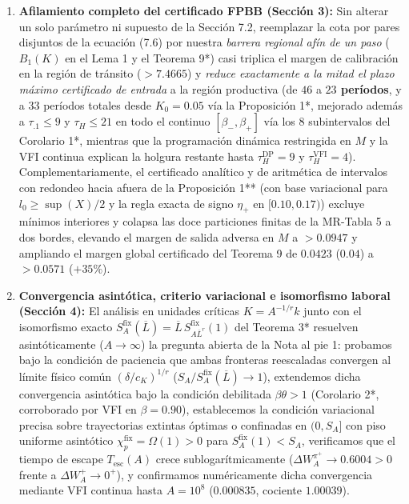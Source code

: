 \documentclass[11pt,letterpaper]{article}
\theoremstyle{plain}
\begin{document}
\begin{enumerate}
\item \textbf{Afilamiento completo del certificado FPBB (Sección 3):} Sin alterar un solo parámetro ni supuesto de la Sección 7.2, reemplazar la cota por pares disjuntos de la ecuación (7.6) por nuestra \emph{barrera regional afín de un paso} ($B_1(K)$ en el Lema 1 y el Teorema 9*) casi triplica el margen de calibración en la región de tránsito ($>7.4665$) y \emph{reduce exactamente a la mitad el plazo máximo certificado de entrada} a la región productiva (de $46$ a \textbf{$23$ períodos}, y a $33$ períodos totales desde $K_0=0.05$ vía la Proposición 1*, mejorado además a $\tau_{.1}\le 9$ y $\tau_H\le 21$ en todo el continuo $[\beta_-,\beta_+]$ vía los $8$ subintervalos del Corolario 1*, mientras que la programación dinámica restringida en $M$ y la VFI continua explican la holgura restante hasta $\tau_H^{\mathrm{DP}}=9$ y $\tau_H^{\mathrm{VFI}}=4$). Complementariamente, el certificado analítico y de aritmética de intervalos con redondeo hacia afuera de la Proposición 1** (con base variacional para $l_0\ge\sup(X)/2$ y la regla exacta de signo $\eta_+$ en $[0.10,0.17)$) excluye mínimos interiores y colapsa las doce particiones finitas de la MR-Tabla 5 a dos bordes, elevando el margen de salida adversa en $M$ a $>0.0947$ y ampliando el margen global certificado del Teorema 9 de $0.0423$ ($0.04$) a \textbf{$>0.0571$} ($+35\%$).

\item \textbf{Convergencia asintótica, criterio variacional e isomorfismo laboral (Sección 4):} El análisis en unidades críticas $K=A^{-1/r}k$ junto con el isomorfismo exacto $S_A^{\mathrm{fix}}(\overline{L})=\overline{L}\,S_{A\overline{L}^r}^{\mathrm{fix}}(1)$ del Teorema 3* resuelven asintóticamente ($A\to\infty$) la pregunta abierta de la Nota al pie 1: probamos bajo la condición de paciencia que ambas fronteras reescaladas convergen al límite físico común $(\delta/c_K)^{1/r}$ ($S_A/S_A^{\mathrm{fix}}(\overline{L})\to 1$), extendemos dicha convergencia asintótica bajo la condición debilitada $\beta\theta>1$ (Corolario 2*, corroborado por VFI en $\beta=0.90$), establecemos la condición variacional precisa sobre trayectorias extintas óptimas o confinadas en $(0,S_A]$ con piso uniforme asintótico $\chi_p^{\mathrm{fix}}=\Omega(1)>0$ para $S_A^{\mathrm{fix}}(1)<S_A$, verificamos que el tiempo de escape $T_{\mathrm{esc}}(A)$ crece sublogarítmicamente ($\Delta W_A^{\pi^+}\to 0.6004 > 0$ frente a $\Delta W_A^+\to 0^+$), y confirmamos numéricamente dicha convergencia mediante VFI continua hasta $A=10^8$ ($0.000835$, cociente $1.00039$).


\end{enumerate}
\end{document}
